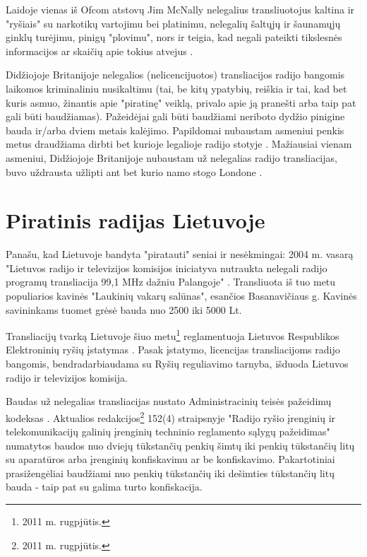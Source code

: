 \documentclass[kursinis-darbas]{vukf}
\begin{document}
Laidoje vienas iš \gls{Ofcom} atstovų Jim McNally nelegalius transliuotojus kaltina ir "ryšiais" su narkotikų vartojimu bei platinimu, nelegalių šaltųjų ir šaunamųjų ginklų turėjimu, pinigų "plovimu", nors ir teigia, kad negali pateikti tikslesnės informacijos ar skaičių apie tokius atvejus \cite{bbc_radio_4_do_pirates_rule_the_air_waves}.

Didžiojoje Britanijoje nelegalios (nelicencijuotos) transliacijos radijo bangomis laikomos kriminaliniu nusikaltimu (tai, be kitų ypatybių, reiškia ir tai, kad bet kuris asmuo, žinantis apie "piratinę" veiklą, privalo apie ją pranešti arba taip pat gali būti baudžiamas). Pažeidėjai gali būti baudžiami neriboto dydžio pinigine bauda ir/arba dviem metais kalėjimo. Papildomai nubaustam asmeniui penkis metus draudžiama dirbti bet kurioje legalioje radijo stotyje \cite{ofcom_pirate_radio_fines}. Mažiausiai vienam asmeniui, Didžiojoje Britanijoje nubaustam už nelegalias radijo transliacijas, buvo uždrausta užlipti ant bet kurio namo stogo Londone \cite{ofcom_pirate_radio_rooftop_ban}.


\section{Piratinis radijas Lietuvoje}

Panašu, kad Lietuvoje bandyta "piratauti" seniai ir nesėkmingai: 2004 m. vasarą "Lietuvos radijo ir televizijos komisijos iniciatyva nutraukta nelegali radijo programų transliacija 99,1 MHz dažniu Palangoje" \cite{rtk_nelegali_transliacija_palangoje}. Transliuota iš tuo metu populiarios kavinės "Laukinių vakarų salūnas", esančios Basanavičiaus g. \cite{ve_palangoje_aptikta_nelegali_radijo_stotis} Kavinės savininkams tuomet grėsė bauda nuo 2500 iki 5000 Lt.

Transliacijų tvarką Lietuvoje šiuo metu\footnote{2011 m. rugpjūtis.} reglamentuoja Lietuvos Respublikos Elektroninių ryšių įstatymas \cite{lr_elektroniniu_rysiu_istatymas}. Pasak įstatymo, licencijas transliacijoms radijo bangomis, bendradarbiaudama su Ryšių reguliavimo tarnyba, išduoda Lietuvos radijo ir televizijos komisija.

Baudas už nelegalias transliacijas nustato Administracinių teisės pažeidimų kodeksas \cite{lr_administraciniu_teises_pazeidimu_kodeksas}. Aktualios redakcijos\footnote{2011 m. rugpjūtis.} 152(4) straipsnyje "Radijo ryšio įrenginių ir telekomunikacijų galinių įrenginių techninio reglamento sąlygų pažeidimas" numatytos baudos nuo dviejų tūkstančių penkių šimtų iki penkių tūkstančių litų su aparatūros arba įrenginių konfiskavimu ar be konfiskavimo. Pakartotiniai prasižengėliai baudžiami nuo penkių tūkstančių iki dešimties tūkstančių litų bauda - taip pat su galima turto konfiskacija.
\end{document}
